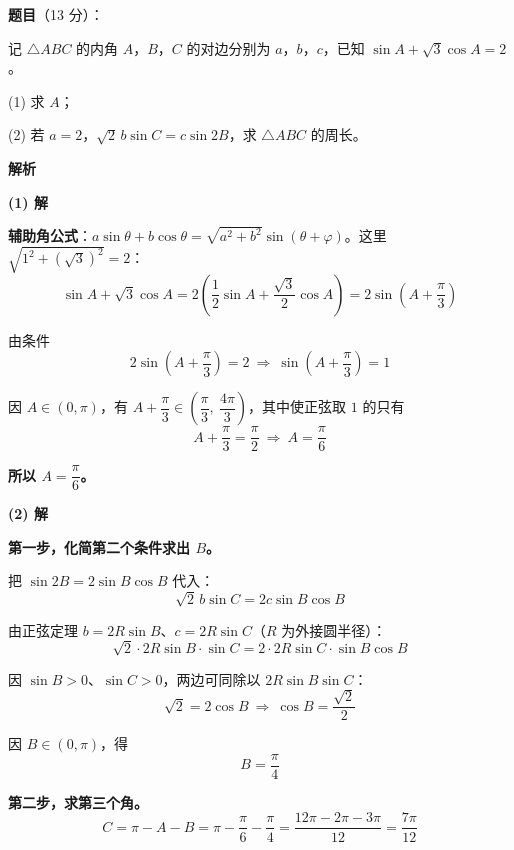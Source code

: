 \begin{answer}

\textbf{题目}（13 分）：

记 $\triangle ABC$ 的内角 $A$，$B$，$C$ 的对边分别为 $a$，$b$，$c$，已知 $\sin A+\sqrt3\cos A=2$。

  (1) 求 $A$；

  (2) 若 $a=2$，$\sqrt2\,b\sin C=c\sin2B$，求 $\triangle ABC$ 的周长。

\textbf{解析}

\par\medskip

\textbf{(1) 解}

\textbf{辅助角公式}：$a\sin\theta+b\cos\theta=\sqrt{a^{2}+b^{2}}\sin(\theta+\varphi)$。这里 $\sqrt{1^{2}+\left(\sqrt3\right)^{2}}=2$：
\nopagebreak[4]
\[\sin A+\sqrt3\cos A=2\left(\frac12\sin A+\frac{\sqrt3}2\cos A\right)=2\sin\left(A+\frac\pi3\right)\]

由条件
\nopagebreak[4]
\[2\sin\left(A+\frac\pi3\right)=2\ \Longrightarrow\ \sin\left(A+\frac\pi3\right)=1\]

因 $A\in(0,\pi)$，有 $A+\dfrac\pi3\in\left(\dfrac\pi3,\ \dfrac{4\pi}3\right)$，其中使正弦取 $1$ 的只有
\nopagebreak[4]
\[A+\frac\pi3=\frac\pi2\ \Longrightarrow\ A=\frac\pi6\]

\textbf{所以 $A=\dfrac\pi6$。}

\par\medskip

\textbf{(2) 解}

\textbf{第一步，化简第二个条件求出 $B$。}

把 $\sin2B=2\sin B\cos B$ 代入：
\nopagebreak[4]
\[\sqrt2\,b\sin C=2c\sin B\cos B\]

由正弦定理 $b=2R\sin B$、$c=2R\sin C$（$R$ 为外接圆半径）：
\nopagebreak[4]
\[\sqrt2\cdot2R\sin B\cdot\sin C=2\cdot2R\sin C\cdot\sin B\cos B\]

因 $\sin B>0$、$\sin C>0$，两边可同除以 $2R\sin B\sin C$：
\nopagebreak[4]
\[\sqrt2=2\cos B\ \Longrightarrow\ \cos B=\frac{\sqrt2}2\]

因 $B\in(0,\pi)$，得
\nopagebreak[4]
\[B=\frac\pi4\]

\textbf{第二步，求第三个角。}
\nopagebreak[4]
\[C=\pi-A-B=\pi-\frac\pi6-\frac\pi4=\frac{12\pi-2\pi-3\pi}{12}=\frac{7\pi}{12}\]


\end{answer}

